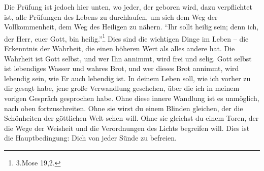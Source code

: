 Die Prüfung ist jedoch hier unten, wo jeder, der geboren wird, dazu verpflichtet ist, alle Prüfungen des Lebens zu durchlaufen, um sich dem Weg der Vollkommenheit, dem Weg des Heiligen zu nähern. "`Ihr sollt heilig sein; denn ich, der Herr, euer Gott, bin heilig."'\footnote{3.Mose 19,2.} Dies sind die wichtigen Dinge im Leben -- die Erkenntnis der Wahrheit, die einen höheren Wert als alles andere hat. Die Wahrheit ist Gott selbst, und wer Ihn annimmt, wird frei und selig. Gott selbst ist lebendiges Wasser und wahres Brot, und wer dieses Brot annimmt, wird lebendig sein, wie Er auch lebendig ist. In deinem Leben soll, wie ich vorher zu dir gesagt habe, jene große Verwandlung geschehen, über die ich in meinem vorigen Gespräch gesprochen habe. Ohne diese innere Wandlung ist es unmöglich, nach oben fortzuschreiten. Ohne sie wirst du einem Blinden gleichen, der die Schönheiten der göttlichen Welt sehen will. Ohne sie gleichst du einem Toren, der die Wege der Weisheit und die Verordnungen des Lichts begreifen will. Dies ist die Hauptbedingung: Dich von jeder Sünde zu befreien. 


